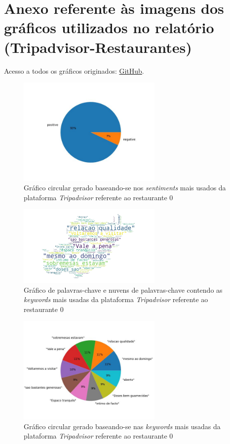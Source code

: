 \chapter{Anexo referente às imagens dos gráficos utilizados no relatório (Tripadvisor-Restaurantes)}

Acesso a todos os gráficos originados: \href{https://github.com/CatKinKitKat/pi2021/tree/master/projecto/datascience/graphs/tripadvisor/restaurants}{GitHub}.

\label{an1}
\begin{figure}[!htb]
\centering
\includegraphics[width=7cm]{figuras/TripAdvisor/Restaurants/restaurant0_sentiments.jpeg}
\caption{Gráfico circular gerado baseando-se nos \textit{sentiments} mais usados da plataforma \textit{Tripadvisor} referente ao restaurante 0}
\label{fig:exemplofig}
\end{figure}

\begin{figure}[!htb]
\centering
\includegraphics[width=7cm]{figuras/TripAdvisor/Restaurants/restaurant0_keywordcloud.jpeg}
\caption{Gráfico de palavras-chave e nuvens de palavras-chave contendo as \textit{keywords} mais usadas da plataforma \textit{Tripadvisor} referente ao restaurante 0}
\label{fig:exemplofig}
\end{figure}

\begin{figure}[!htb]
\centering
\includegraphics[width=7cm]{figuras/TripAdvisor/Restaurants/restaurant0_keywords.jpeg}
\caption{Gráfico circular gerado baseando-se nas \textit{keywords} mais usadas da plataforma \textit{Tripadvisor} referente ao restaurante 0}
\label{fig:exemplofig}
\end{figure}

